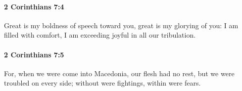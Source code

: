 		\paragraph{2 Corinthians 7:4} %
			\label{2CORINTHIANS-7-4}

			Great is my boldness of speech toward you, great is my glorying of you: I am filled with comfort, I am exceeding joyful in all our tribulation.

			\begin{framed}
			\scriptsize
				\begin{compactdesc}
					\item[SBLG] 
				\end{compactdesc}
			\end{framed}

		\paragraph{2 Corinthians 7:5} %
			\label{2CORINTHIANS-7-5}

			For, when we were come into Macedonia, our flesh had no rest, but we were troubled on every side; without were fightings, within were fears.

